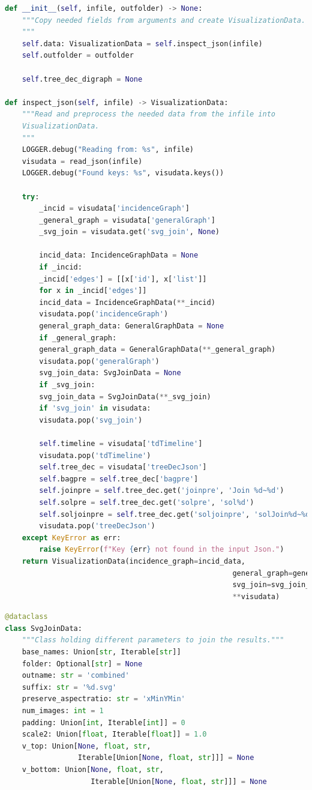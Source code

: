 \documentclass[a4paper, 12pt, bibliography=totoc]{scrartcl}
\begin{document}
\begin{lstlisting}[language={Python}, caption={Initializing a Visualization object}, label={lst:visuinit}]
def __init__(self, infile, outfolder) -> None:
	"""Copy needed fields from arguments and create VisualizationData.
	"""
	self.data: VisualizationData = self.inspect_json(infile)
	self.outfolder = outfolder
	
	self.tree_dec_digraph = None
	
def inspect_json(self, infile) -> VisualizationData:
	"""Read and preprocess the needed data from the infile into 
	VisualizationData.
	"""
	LOGGER.debug("Reading from: %s", infile)
	visudata = read_json(infile)
	LOGGER.debug("Found keys: %s", visudata.keys())
	
	try:
		_incid = visudata['incidenceGraph']
		_general_graph = visudata['generalGraph']
		_svg_join = visudata.get('svg_join', None)
		
		incid_data: IncidenceGraphData = None
		if _incid:
		_incid['edges'] = [[x['id'], x['list']]
		for x in _incid['edges']]
		incid_data = IncidenceGraphData(**_incid)
		visudata.pop('incidenceGraph')
		general_graph_data: GeneralGraphData = None
		if _general_graph:
		general_graph_data = GeneralGraphData(**_general_graph)
		visudata.pop('generalGraph')
		svg_join_data: SvgJoinData = None
		if _svg_join:
		svg_join_data = SvgJoinData(**_svg_join)
		if 'svg_join' in visudata:
		visudata.pop('svg_join')
		
		self.timeline = visudata['tdTimeline']
		visudata.pop('tdTimeline')
		self.tree_dec = visudata['treeDecJson']
		self.bagpre = self.tree_dec['bagpre']
		self.joinpre = self.tree_dec.get('joinpre', 'Join %d~%d')
		self.solpre = self.tree_dec.get('solpre', 'sol%d')
		self.soljoinpre = self.tree_dec.get('soljoinpre', 'solJoin%d~%d')
		visudata.pop('treeDecJson')
	except KeyError as err:
		raise KeyError(f"Key {err} not found in the input Json.")
	return VisualizationData(incidence_graph=incid_data,
													 general_graph=general_graph_data,
													 svg_join=svg_join_data,
													 **visudata)

\end{lstlisting}

\begin{lstlisting}[language={Python}, caption={SvgJoinData}, label={lst:svgjoindataclass}]
@dataclass
class SvgJoinData:
	"""Class holding different parameters to join the results."""
	base_names: Union[str, Iterable[str]]
	folder: Optional[str] = None
	outname: str = 'combined'
	suffix: str = '%d.svg'
	preserve_aspectratio: str = 'xMinYMin'
	num_images: int = 1
	padding: Union[int, Iterable[int]] = 0
	scale2: Union[float, Iterable[float]] = 1.0
	v_top: Union[None, float, str, 
	             Iterable[Union[None, float, str]]] = None
	v_bottom: Union[None, float, str, 
	                Iterable[Union[None, float, str]]] = None	
\end{lstlisting}
\end{document}
